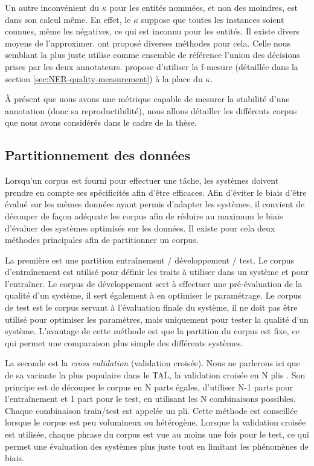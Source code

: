 \documentclass[12pt,a4paper,times,twoside,openright]{report}
\begin{document}
Un autre inconvénient du $\kappa$ pour les entités nommées, et non des moindres, est dans son calcul même. En effet, le $\kappa$ suppose que toutes les instances soient connues, même les négatives, ce qui est inconnu pour les entités. Il existe divers moyens de l'approximer. \citet{grouin2011proposal} ont proposé diverses méthodes pour cela. Celle nous semblant la plus juste utilise comme ensemble de référence l'union des décisions prises par les deux annotateurs. \citet{deleger2012building} propose d'utiliser la f-mesure (détaillée dans la section \ref{sec:NER-quality-measurement}) à la place du $\kappa$.

À présent que nous avons une métrique capable de mesurer la stabilité d'une annotation (donc sa reproductibilité), nous allons détailler les différents corpus que nous avons considérés dans le cadre de la thèse.


        
        \subsection{Partitionnement des données}
        \label{subsec:data-partition}
Lorsqu'un corpus est fourni pour effectuer une tâche, les systèmes doivent prendre en compte ses spécificités afin d'être efficaces. Afin d'éviter le biais d'être évalué sur les mêmes données ayant permis d'adapter les systèmes, il convient de découper de façon adéquate les corpus afin de réduire au maximum le biais d'évaluer des systèmes optimisés sur les données. Il existe pour cela deux méthodes principales afin de partitionner un corpus.

La première est une partition entraînement / développement / test. Le corpus d'entraînement est utilisé pour définir les traits à utiliser dans un système et pour l'entraîner. Le corpus de développement sert à effectuer une pré-évaluation de la qualité d'un système, il sert également à en optimiser le paramétrage. Le corpus de test est le corpus servant à l'évaluation finale du système, il ne doit pas être utilisé pour optimiser les paramètres, mais uniquement pour tester la qualité d'un système. L'avantage de cette méthode est que la partition du corpus est fixe, ce qui permet une comparaison plus simple des différents systèmes.

La seconde est la \textit{cross validation} (validation croisée). Nous ne parlerons ici que de sa variante la plus populaire dans le TAL, la validation croisée en N plis \citep{geisser1975predictive}. Son principe est de découper le corpus en N parts égales, d'utiliser N-1 parts pour l'entraînement et 1 part pour le test, en utilisant les N combinaisons possibles. Chaque combinaison train/test est appelée un pli. Cette méthode est conseillée lorsque le corpus est peu volumineux ou hétérogène. Lorsque la validation croisée est utilisée, chaque phrase du corpus est vue au moins une fois pour le test, ce qui permet une évaluation des systèmes plus juste tout en limitant les phénomènes de biais.
\end{document}
